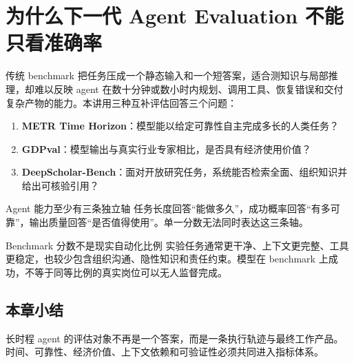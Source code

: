 \section{为什么下一代 Agent Evaluation 不能只看准确率}

传统 benchmark 把任务压成一个静态输入和一个短答案，适合测知识与局部推理，却难以反映 agent 在数十分钟或数小时内规划、调用工具、恢复错误和交付复杂产物的能力。本讲用三种互补评估回答三个问题：

\begin{enumerate}
    \item \textbf{METR Time Horizon}：模型能以给定可靠性自主完成多长的人类任务？
    \item \textbf{GDPval}：模型输出与真实行业专家相比，是否具有经济使用价值？
    \item \textbf{DeepScholar-Bench}：面对开放研究任务，系统能否检索全面、组织知识并给出可核验引用？
\end{enumerate}


\begin{importantbox}{Agent 能力至少有三条独立轴}
任务长度回答“能做多久”，成功概率回答“有多可靠”，输出质量回答“是否值得使用”。单一分数无法同时表达这三条轴。
\end{importantbox}

\begin{warningbox}{Benchmark 分数不是现实自动化比例}
实验任务通常更干净、上下文更完整、工具更稳定，也较少包含组织沟通、隐性知识和责任约束。模型在 benchmark 上成功，不等于同等比例的真实岗位可以无人监督完成。
\end{warningbox}

\subsection{本章小结}

长时程 agent 的评估对象不再是一个答案，而是一条执行轨迹与最终工作产品。时间、可靠性、经济价值、上下文依赖和可验证性必须共同进入指标体系。

